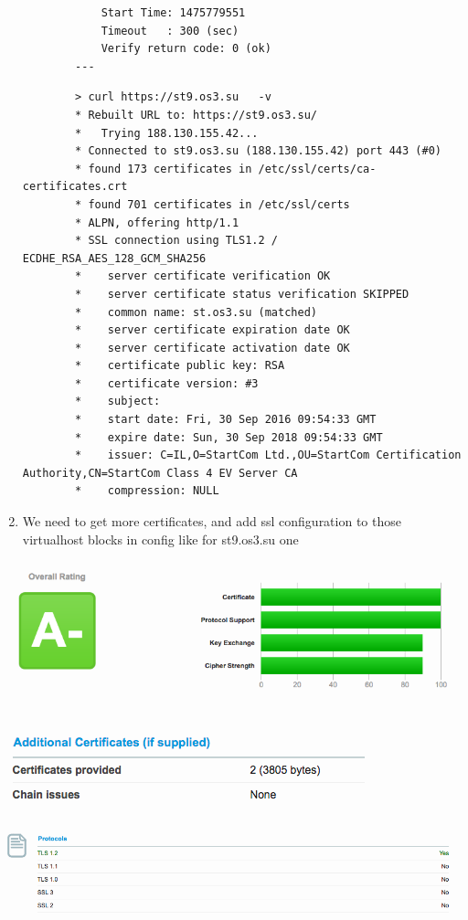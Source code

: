 \documentclass[10pt]{article}
\begin{document}
\begin{enumerate}
\begin{verbatim}
            Start Time: 1475779551
            Timeout   : 300 (sec)
            Verify return code: 0 (ok)
        ---
        \end{verbatim}
        \begin{verbatim}
        > curl https://st9.os3.su   -v
        * Rebuilt URL to: https://st9.os3.su/
        *   Trying 188.130.155.42...
        * Connected to st9.os3.su (188.130.155.42) port 443 (#0)
        * found 173 certificates in /etc/ssl/certs/ca-certificates.crt
        * found 701 certificates in /etc/ssl/certs
        * ALPN, offering http/1.1
        * SSL connection using TLS1.2 / ECDHE_RSA_AES_128_GCM_SHA256
        *    server certificate verification OK
        *    server certificate status verification SKIPPED
        *    common name: st.os3.su (matched)
        *    server certificate expiration date OK
        *    server certificate activation date OK
        *    certificate public key: RSA
        *    certificate version: #3
        *    subject:
        *    start date: Fri, 30 Sep 2016 09:54:33 GMT
        *    expire date: Sun, 30 Sep 2018 09:54:33 GMT
        *    issuer: C=IL,O=StartCom Ltd.,OU=StartCom Certification Authority,CN=StartCom Class 4 EV Server CA
        *    compression: NULL
        \end{verbatim}
        \item We need to get more certificates, and add ssl configuration to those virtualhost blocks in config like for st9.os3.su one
\end{enumerate}

\includegraphics[width=\textwidth, scale=0.5]{validcrt1} \\ \\
\includegraphics[width=\textwidth, scale=0.5]{validcrt2} \\ \\
\includegraphics[width=\textwidth, scale=0.5]{validcrt3} \\ \\ \cite{check}
\end{document}
